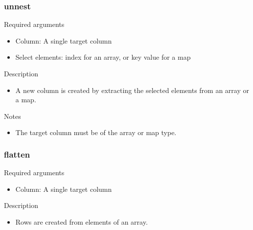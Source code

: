 \documentclass[letterpaper,10pt,english]{sphinxmanual}
\begin{document}
\subsubsection{unnest}
\label{\detokenize{discovery/part07/rule_kinds:unnest}}
\begin{figure}[H]
\centering

\noindent{}
\end{figure}

Required arguments
\begin{itemize}
\item {} 
Column: A single target column

\item {} 
Select elements:  index for an array, or key value for a map

\end{itemize}

Description
\begin{itemize}
\item {} 
A new column is created by extracting the selected elements from an array or a map.

\end{itemize}

Notes
\begin{itemize}
\item {} 
The target column must be of the array or map type.

\end{itemize}


\subsubsection{flatten}
\label{\detokenize{discovery/part07/rule_kinds:flatten}}
Required arguments
\begin{itemize}
\item {} 
Column: A single target column

\end{itemize}

Description
\begin{itemize}
\item {} 
Rows are created from elements of an array.

\end{itemize}
\end{document}
